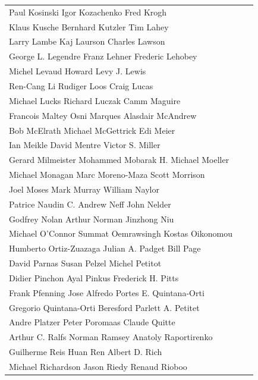 \vfill
\newpage
\begin{tabular}{lll}
Paul Kosinski          Igor Kozachenko        Fred Krogh\\
Klaus Kusche           Bernhard Kutzler       Tim Lahey\\
Larry Lambe            Kaj Laurson            Charles Lawson\\
George L. Legendre     Franz Lehner           Frederic Lehobey\\
Michel Levaud          Howard Levy            J. Lewis\\
Ren-Cang Li            Rudiger Loos           Craig Lucas\\
Michael Lucks          Richard Luczak         Camm Maguire\\
Francois Maltey        Osni Marques           Alasdair McAndrew\\
Bob McElrath           Michael McGettrick     Edi Meier\\
Ian Meikle             David Mentre           Victor S. Miller\\
Gerard Milmeister      Mohammed Mobarak       H. Michael Moeller\\
Michael Monagan        Marc Moreno-Maza       Scott Morrison\\
Joel Moses             Mark Murray            William Naylor\\
Patrice Naudin         C. Andrew Neff         John Nelder\\
Godfrey Nolan          Arthur Norman          Jinzhong Niu\\
Michael O'Connor       Summat Oemrawsingh     Kostas Oikonomou\\
Humberto Ortiz-Zuazaga Julian A. Padget       Bill Page\\
David Parnas           Susan Pelzel           Michel Petitot\\
Didier Pinchon         Ayal Pinkus            Frederick H. Pitts\\
Frank Pfenning         Jose Alfredo Portes    E. Quintana-Orti\\
Gregorio Quintana-Orti Beresford Parlett      A. Petitet\\
Andre Platzer          Peter Poromaas         Claude Quitte\\
Arthur C. Ralfs        Norman Ramsey          Anatoly Raportirenko\\
Guilherme Reis         Huan Ren               Albert D. Rich\\
Michael Richardson     Jason Riedy            Renaud Rioboo\\

\end{tabular}
